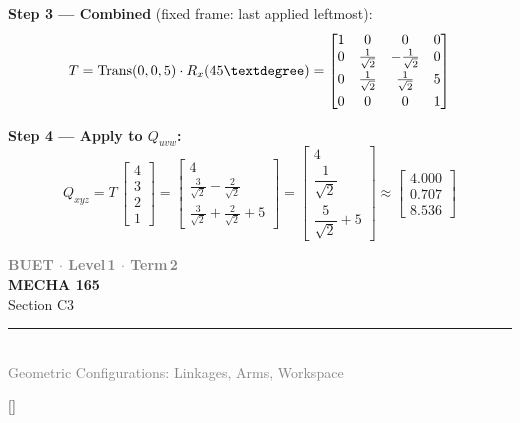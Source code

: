 \documentclass[12pt,a3paper]{article}
\newcommand{\secdivider}[4]{%
  \newpage\thispagestyle{empty}%
  \vspace*{\fill}%
  \begin{tcolorbox}[enhanced,colback=#4!7,colframe=#3,boxrule=1.5pt,arc=8pt,
    left=20pt,right=20pt,top=22pt,bottom=22pt,
    shadow={3pt}{-3pt}{0pt}{black!15}]
    \centering
    {\large\textcolor{gray}{\textbf{BUET $\cdot$ Level\,1 $\cdot$ Term\,2}}}\\[8pt]
    {\fontsize{26}{32}\selectfont\bfseries\textcolor{#3}{MECHA 165}}\\[6pt]
    {\fontsize{15}{19}\selectfont\textcolor{dgray}{#1}}\\[12pt]
    \textcolor{#3!60}{\rule{0.5\textwidth}{0.5pt}}\\[6pt]
    {\small\textcolor{gray}{#2}}
  \end{tcolorbox}%
  \vspace*{\fill}\newpage%
}
\begin{document}
\begin{enumerate}
\begin{tcolorbox}[enhanced,breakable,ansbox,colback=cB!4,colframe=cB,
  boxrule=0.8pt,arc=5pt,
  title={\textbf{Answer}},fonttitle=\bfseries\color{white},
  colbacktitle=cB]
\textbf{Step 3 — Combined} (fixed frame: last applied leftmost):
\[
  T = \mathrm{Trans}(0,0,5)\cdot R_x(45\textdegree)
  =
  \begin{bmatrix}
    1 & 0                    & 0                   & 0\\
    0 & \frac{1}{\sqrt{2}}   & -\frac{1}{\sqrt{2}} & 0\\[4pt]
    0 & \frac{1}{\sqrt{2}}   &  \frac{1}{\sqrt{2}} & 5\\[4pt]
    0 & 0                    & 0                   & 1
  \end{bmatrix}
\]

\textbf{Step 4 — Apply to $Q_{uvw}$:}
\[
  Q_{xyz} = T\,\begin{bmatrix}4\\3\\2\\1\end{bmatrix}
  =
  \begin{bmatrix}
    4 \\
    \frac{3}{\sqrt{2}} - \frac{2}{\sqrt{2}} \\[4pt]
    \frac{3}{\sqrt{2}} + \frac{2}{\sqrt{2}} + 5
  \end{bmatrix}
  =
  \begin{bmatrix}
    4 \\[2pt]
    \dfrac{1}{\sqrt{2}} \\[6pt]
    \dfrac{5}{\sqrt{2}} + 5
  \end{bmatrix}
  \approx
  \begin{bmatrix}4.000\\0.707\\8.536\end{bmatrix}
\]

\end{tcolorbox}


\end{enumerate}
\secdivider{Section C3}{Geometric Configurations: Linkages, Arms, Workspace}{cC}{cC}
\label{sec:C3}
\titleformat{\section}{\large\bfseries\color{cC}}{}{0em}{}[\titlerule]
\end{document}
